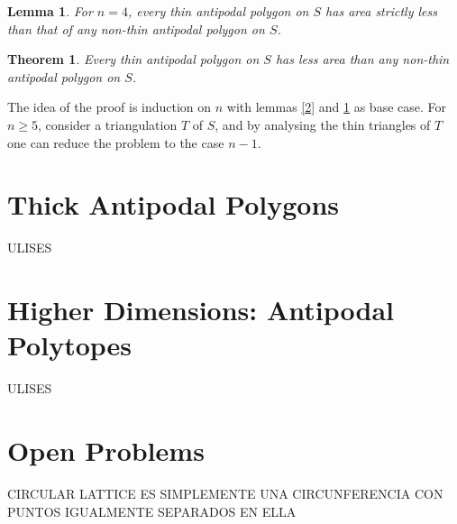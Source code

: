 \documentclass[twoside]{article}
\newtheorem{lem}[defin]{Lemma}
\newtheorem{thm}[defin]{Theorem}
\begin{document}
\begin{lem}\label{3}
For $n = 4$, every thin antipodal polygon on $S$ has area strictly less than
that of any non-thin antipodal polygon on $S$.
\end{lem}


\begin{thm}
Every thin antipodal polygon on $S$ has less area than any non-thin antipodal
polygon on $S$.
\end{thm}

The idea of the proof is induction on $n$ with lemmas \ref{2} and \ref{3} as base case. For $n\geq 5$, consider a triangulation $T$ of $S$, and by analysing the thin triangles of $T$ one can reduce the problem to the case $n-1$. 


\section{Thick Antipodal Polygons}
ULISES

\section{Higher Dimensions: Antipodal Polytopes}
ULISES


 \section{Open Problems}
CIRCULAR LATTICE ES SIMPLEMENTE UNA CIRCUNFERENCIA CON PUNTOS IGUALMENTE SEPARADOS EN ELLA
\end{document}
